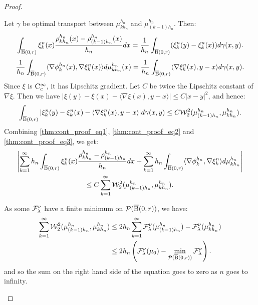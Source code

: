 \begin{proof}
\begin{enumerate}[wide, labelwidth=!, labelindent=0pt,label=(\arabic*)]
Let $\gamma$ be optimal transport between $\mu_{kh_n}^{h_n}$ and $\mu_{(k-1)h_n}^{h_n}$. Then:
\begin{equation} \label{thm:cont_proof_eq1}
\int_{\operatorname{\overline{B}}(0,r)} \xi_k^n(x) \frac{\rho_{kh_n}^{h_n}(x) - \rho_{(k-1)h_n}^{h_n}(x)}{h_n} dx = \frac{1}{h_n} \int_{\operatorname{\overline{B}}(0,r)} (\xi_k^n(y) - \xi_k^n(x)) d\gamma(x,y).
\end{equation}
\begin{equation} \label{thm:cont_proof_eq2}
\frac{1}{h_n}\int_{\operatorname{\overline{B}}(0,r)} \langle \nabla \phi_k^{h_n}(x) , \nabla \xi_k^n(x) \rangle d\mu_{kh_n}^{h_n}(x)  = \frac{1}{h_n} \int_{\operatorname{\overline{B}}(0,r)} \langle \nabla \xi_k^n(x), y-x \rangle d\gamma(x,y). 
\end{equation}
Since $\xi$ is $\mathrm{C}_c^{\infty}$, it has Lipschitz gradient. Let $C$ be twice the Lipschitz constant of $\nabla \xi$. Then we have $| \xi(y) - \xi(x) - \langle \nabla \xi(x), y-x \rangle | \leq C|x- y|^2$, and hence:
\begin{equation} \label{thm:cont_proof_eq3}
\int_{\operatorname{\overline{B}}(0,r)} |\xi_k^n(y) - \xi_k^n(x) - \langle \nabla \xi_k^n(x), y-x \rangle | d \gamma(x,y) \leq C{\cal W}_2^2( \mu_{(k-1)h_n}^{h_n}, \mu_{kh_n}^{h_n}).
\end{equation}
Combining \ref{thm:cont_proof_eq1}, \ref{thm:cont_proof_eq2} and \ref{thm:cont_proof_eq3}, we get:
\begin{multline} \label{thm:cont_proof_eq4}
\left|\sum_{k=1}^{\infty} h_n \int_{\operatorname{\overline{B}}(0,r)} \xi_k^n(x) \frac{\rho_{kh_n}^{h_n} - \rho_{(k-1)h_n}^{h_n}}{h_n} dx  + 
\sum_{k=1}^{\infty} h_n\int_{\operatorname{\overline{B}}(0,r)} \langle \nabla \phi_k^{h_n} , \nabla \xi_k^n \rangle d\mu_{kh_n}^{h_n} \right| \\
\leq C\sum_{k=1}^{\infty} {\cal W}_2^2(\mu_{(k-1)h_n}^{h_n}, \mu_{kh_n}^{h_n}).
\end{multline}

As  some $\mathcal{F}^{\nu}_{\lambda}$ have a finite minimum on $\mathcal{P}(\operatorname{\overline{B}}(0,r))$, we have:
\begin{equation} \label{thm:cont_proof_eq5}
\begin{aligned}
\sum_{k=1}^{\infty} {\cal W}_2^2(\mu_{(k-1)h_n}^{h_n}, \mu_{kh_n}^{h_n}) & \leq  2 h_n \sum_{k=1}^{\infty} \mathcal{F}^{\nu}_{\lambda}(\mu_{(k-1)h_n}^{h_n}) - \mathcal{F}^{\nu}_{\lambda}(\mu_{kh_n}^{h_n}) \\ & \leq 2h_n \left(\mathcal{F}^{\nu}_{\lambda}(\mu_0) - \min_{\mathcal{P}(\operatorname{\overline{B}}(0,r))}\mathcal{F}^{\nu}_{\lambda} \right).
\end{aligned}
\end{equation}
and so the sum on the right hand side of the equation goes to zero as $n$ goes to infinity.


\end{enumerate}
\end{proof}
